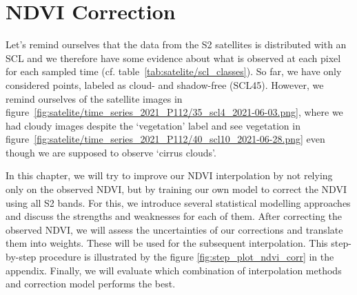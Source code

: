 \chapter{NDVI Correction} \label{sec:corr}

{
    Let's remind ourselves that the data from the S2 satellites is distributed  with an SCL and we therefore have some evidence about what is observed at each pixel for each sampled time (cf. table~\ref{tab:satelite/scl_classes}). So far, we have only considered points, labeled as cloud- and shadow-free (SCL45). However, we remind ourselves of the satellite images in figure~\ref{fig:satelite/time_series_2021_P112/35_scl4_2021-06-03.png}, where we had cloudy images despite the `vegetation' label and see vegetation in figure~\ref{fig:satelite/time_series_2021_P112/40_scl10_2021-06-28.png} even though we are supposed to observe `cirrus clouds'.
    


    
    In this chapter, we will try to improve our NDVI interpolation by not relying only on the observed NDVI, but by training our own model to correct the NDVI using all S2 bands. For this, we introduce several statistical modelling approaches and discuss the strengths and weaknesses for each of them. After correcting the observed NDVI, we will assess the uncertainties of our corrections and translate them into weights. These will be used for the subsequent interpolation. This step-by-step procedure is illustrated by the figure \ref{fig:step_plot_ndvi_corr} in the appendix. Finally, we will evaluate which combination of interpolation methods and correction model performs the best.
}

